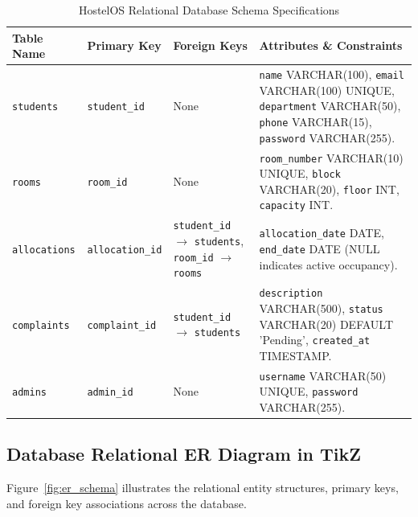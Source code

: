 \documentclass[12pt,a4paper]{article}
\begin{document}
\begin{table}[H]
\centering
\footnotesize
\setlength{\tabcolsep}{5pt}
\renewcommand{\arraystretch}{1.1}
\begin{tabularx}{\textwidth}{p{2.0cm} p{2.2cm} p{3.2cm} X}
\toprule
\textbf{Table Name} & \textbf{Primary Key} & \textbf{Foreign Keys} & \textbf{Attributes \& Constraints} \\
\midrule
\texttt{students}    & \texttt{student\_id}    & None & \texttt{name} VARCHAR(100), \texttt{email} VARCHAR(100) UNIQUE, \texttt{department} VARCHAR(50), \texttt{phone} VARCHAR(15), \texttt{password} VARCHAR(255). \\
\texttt{rooms}       & \texttt{room\_id}       & None & \texttt{room\_number} VARCHAR(10) UNIQUE, \texttt{block} VARCHAR(20), \texttt{floor} INT, \texttt{capacity} INT. \\
\texttt{allocations} & \texttt{allocation\_id} & \texttt{student\_id} $\rightarrow$ \texttt{students}, \texttt{room\_id} $\rightarrow$ \texttt{rooms} & \texttt{allocation\_date} DATE, \texttt{end\_date} DATE (NULL indicates active occupancy). \\
\texttt{complaints}  & \texttt{complaint\_id}  & \texttt{student\_id} $\rightarrow$ \texttt{students} & \texttt{description} VARCHAR(500), \texttt{status} VARCHAR(20) DEFAULT 'Pending', \texttt{created\_at} TIMESTAMP. \\
\texttt{admins}      & \texttt{admin\_id}      & None & \texttt{username} VARCHAR(50) UNIQUE, \texttt{password} VARCHAR(255). \\
\bottomrule
\end{tabularx}
\caption{HostelOS Relational Database Schema Specifications}
\label{tab:db_schema}
\end{table}

\subsection{Database Relational ER Diagram in TikZ}
\label{sec:er_tikz}
Figure~\ref{fig:er_schema} illustrates the relational entity structures, primary keys, and foreign key associations across the database.
\end{document}
